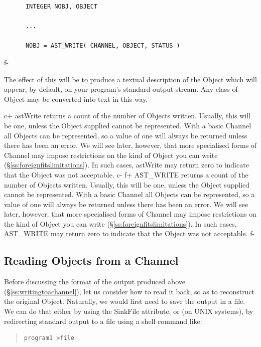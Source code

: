 \documentclass[twoside,11pt]{article}
\newcommand{\secref}[1]{\S\ref{#1}}
\newcommand{\secref}[1]{\ref{#1}}
\begin{document}
\small
\begin{verbatim}
      INTEGER NOBJ, OBJECT

      ...

      NOBJ = AST_WRITE( CHANNEL, OBJECT, STATUS )
\end{verbatim}
\normalsize
f-

The effect of this will be to produce a textual description of the
Object which will appear, by default, on your program's standard
output stream. Any class of Object may be converted into text in this
way.

c+
astWrite returns a count of the number of Objects written. Usually,
this will be one, unless the Object supplied cannot be
represented. With a basic Channel all Objects can be represented, so a
value of one will always be returned unless there has been an
error. We will see later, however, that more specialised forms of
Channel may impose restrictions on the kind of Object you can write
(\secref{ss:foreignfitslimitations}). In such cases, astWrite may
return zero to indicate that the Object was not acceptable.
c-
f+
AST\_WRITE returns a count of the number of Objects written. Usually,
this will be one, unless the Object supplied cannot be
represented. With a basic Channel all Objects can be represented, so a
value of one will always be returned unless there has been an
error. We will see later, however, that more specialised forms of
Channel may impose restrictions on the kind of Object you can write
(\secref{ss:foreignfitslimitations}). In such cases, AST\_WRITE may
return zero to indicate that the Object was not acceptable.
f-

\subsection{\label{ss:readingfromachannel}Reading Objects from a Channel}

Before discussing the format of the output produced above
(\secref{ss:writingtoachannel}), let us consider how to read it back,
so as to reconstruct the original Object. Naturally, we would first
need to save the output in a file. We can do that either by using the
SinkFile attribute, or (on UNIX systems), by redirecting standard output
to a file using a shell command like:

\begin{quote}
\small
\begin{verbatim}
program1 >file
\end{verbatim}
\normalsize
\end{quote}
\end{document}
